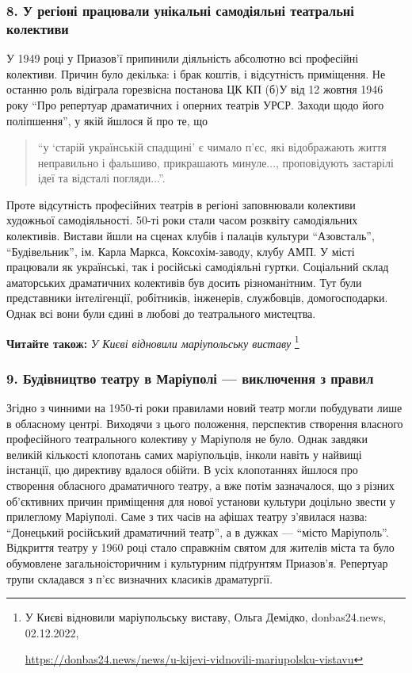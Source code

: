 \subsubsection{8. У регіоні працювали унікальні самодіяльні театральні колективи}

У 1949 році у Приазов'ї припинили діяльність абсолютно всі професійні
колективи. Причин було декілька: і брак коштів, і відсутність приміщення. Не
останню роль відіграла горезвісна постанова ЦК КП (б)У від 12 жовтня 1946 року
\enquote{Про репертуар драматичних і оперних театрів УРСР. Заходи щодо його
поліпшення}, у якій йшлося й про те, що 

\begin{quote}
\enquote{у \enquote{старій українській спадщині} є
чимало п'єс, які відображають життя неправильно і фальшиво, прикрашають
минуле..., проповідують застарілі ідеї та відсталі погляди...}. 
\end{quote}

Проте відсутність професійних театрів в регіоні заповнювали колективи
художньої самодіяльності.  50-ті роки стали часом розквіту самодіяльних
колективів. Вистави йшли на сценах клубів і палаців культури
\enquote{Азовсталь}, \enquote{Будівельник}, ім. Карла Маркса, Коксохім-заводу, клубу
АМП. У місті працювали як українські, так і російські самодіяльні
гуртки. Соціальний склад аматорських драматичних колективів був досить
різноманітним. Тут були представники інтелігенції, робітників,
інженерів, службовців, домогосподарки. Однак всі вони були єдині в
любові до театрального мистецтва.

\textbf{Читайте також:} \emph{У Києві відновили маріупольську виставу}%
\footnote{У Києві відновили маріупольську виставу, Ольга Демідко, donbas24.news, 02.12.2022, \par%
\url{https://donbas24.news/news/u-kijevi-vidnovili-mariupolsku-vistavu}%
}


\subsubsection{9. Будівництво театру в Маріуполі — виключення з правил}

Згідно з чинними на 1950-ті роки правилами новий театр могли побудувати лише в
обласному центрі. Виходячи з цього положення, перспектив створення власного
професійного театрального колективу у Маріуполя не було. Однак завдяки великій
кількості клопотань самих маріупольців, інколи навіть у найвищі інстанції, цю
директиву вдалося обійти. В усіх клопотаннях йшлося про створення обласного
драматичного театру, а вже потім зазначалося, що з різних об'єктивних причин
приміщення для нової установи культури доцільно звести у прилеглому Маріуполі.
Саме з тих часів на афішах театру з'явилася назва: \enquote{Донецький російський
драматичний театр}, а в дужках — \enquote{місто Маріуполь}. Відкриття театру у 1960
році стало справжнім святом для жителів міста та було обумовлене
загальноісторичним і культурним підґрунтям Приазов'я. Репертуар трупи складався
з п'єс визначних класиків драматургії.

